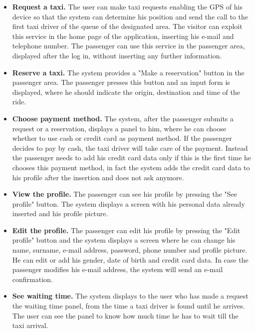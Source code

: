 \documentclass[18pt,oneside,a4paper, titlepage]{article}
\begin{document}
\begin{itemize}
			\item \textbf{Request a taxi.}
				The user can make taxi requests enabling the GPS of his device so that the system can determine his position and send the call to the first taxi driver of the queue of the designated area.
				The visitor can exploit this service in the home page of the application, inserting his e-mail and telephone number.
				The passenger can use this service in the passenger area, displayed after the log in, without inserting any further information.
				
			\item \textbf{Reserve a taxi.}
				The system provides a "Make a reservation" button in the passenger area. The passenger presses this button and an input form is displayed, where he should indicate the origin, destination and time of the ride.
				
				
			\item \textbf{Choose payment method.}
				The system, after the passenger submits a request or a reservation, displays a panel to him, where he can choose whether to use cash or credit card as payment method. If the passenger decides to pay by cash, the taxi driver will take care of the payment. Instead the passenger needs to add his credit card data only if this is the first time he chooses this payment method, in fact the system adds the credit card data to his profile after the insertion and does not ask anymore. 
				
			\item \textbf{View the profile.}
				The passenger can see his profile by pressing the "See profile" button. The system displays a screen with his personal data already inserted and his profile picture.
				
			\item \textbf{Edit the profile.}
				 The passenger can edit his profile by pressing the "Edit profile" button and the system displays a screen where he can change his name, surname, e-mail address, password, phone number and profile picture. He can edit or add his gender, date of birth and credit card data. In case the passenger modifies his e-mail address, the system will send an e-mail confirmation.
				 
			\item \textbf{See waiting time.}
				The system displays to the user who has made a request the waiting time panel, from the time a taxi driver is found until he arrives. The user can see the panel to know how much time he has to wait till the taxi arrival.
				

\end{itemize}
\end{document}
